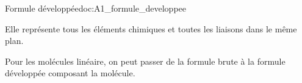 

\newpage
\vspace*{-40pt}

\vspace*{-8pt}
\begin{doc}{Formule développée}{doc:A1_formule_developpee}
  \begin{importants}  
    Elle représente tous les éléments chimiques et toutes les liaisons dans le même plan.
  \end{importants}

  \exemple*
  \vspace*{-18pt}
  \begin{center}
    \qq{}
    \qq{}
  \end{center}
\end{doc}

Pour les molécules linéaire, on peut passer de la formule brute à la formule développée  composant la molécule.


